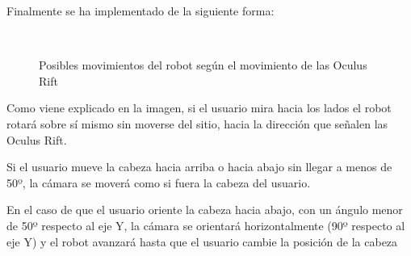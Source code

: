 \documentclass[twoside, 12pt]{epstfg}
\begin{document}
Finalmente se ha implementado de la siguiente forma:


\begin{figure}[h]
	\centering
	\\
	\caption{Posibles movimientos del robot según el movimiento de las Oculus Rift} \label{movRobot}
\end{figure}

Como viene explicado en la imagen, si el usuario mira hacia los lados el robot rotará sobre sí mismo sin moverse del sitio, hacia la dirección que señalen las Oculus Rift.

Si el usuario mueve la cabeza hacia arriba o hacia abajo sin llegar a menos de 50º, la cámara se moverá como si fuera la cabeza del usuario.

En el caso de que el usuario oriente la cabeza hacia abajo, con un ángulo menor de 50º respecto al eje Y, la cámara se orientará horizontalmente (90º respecto al eje Y) y el robot avanzará hasta que el usuario cambie la posición de la cabeza
\end{document}
